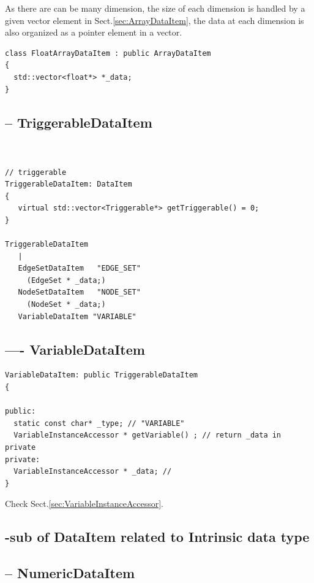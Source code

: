 As there are can be many dimension, the size of each dimension is handled by a
given vector element in Sect.\ref{sec:ArrayDataItem}, the data at each dimension
is also organized as a pointer element in a vector.

\begin{verbatim}
class FloatArrayDataItem : public ArrayDataItem
{
  std::vector<float*> *_data;
}
\end{verbatim}


\subsection{-- TriggerableDataItem}
\label{sec:TriggerableDataItem}

\begin{verbatim}

   
// triggerable
TriggerableDataItem: DataItem
{
   virtual std::vector<Triggerable*> getTriggerable() = 0;
}   

TriggerableDataItem
   |
   EdgeSetDataItem   "EDGE_SET"
     (EdgeSet * _data;)
   NodeSetDataItem   "NODE_SET"
     (NodeSet * _data;)
   VariableDataItem "VARIABLE"

\end{verbatim}



\subsection{---- VariableDataItem}
\label{sec:VariableDataItem}

\begin{verbatim}
VariableDataItem: public TriggerableDataItem
{

public:
  static const char* _type; // "VARIABLE"
  VariableInstanceAccessor * getVariable() ; // return _data in private
private:
  VariableInstanceAccessor * _data; //
}
\end{verbatim}
Check Sect.\ref{sec:VariableInstanceAccessor}.


\subsection{-sub of DataItem related to Intrinsic data type}

\subsection{-- NumericDataItem}
\label{sec:NumericDataItem}

